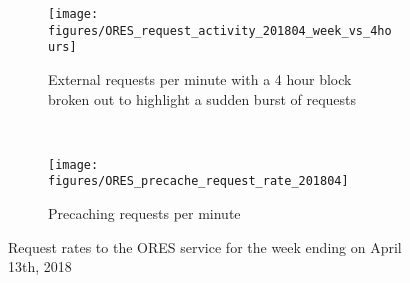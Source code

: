 \begin{figure}[h]
\centering
\begin{subfigure}[t]{\columnwidth}
  \centering
  \texttt{[image: figures/ORES\_request\_activity\_201804\_week\_vs\_4hours]}
  \caption{External requests per minute with a 4 hour block broken out to highlight a sudden burst of requests}
  \label{fig:ores_request_rate}
\end{subfigure}\\
\begin{subfigure}[t]{\columnwidth}
  \centering
  \texttt{[image: figures/ORES\_precache\_request\_rate\_201804]}
  \caption{Precaching requests per minute}
  \label{fig:ores_precache_rate}
\end{subfigure}
\caption{Request rates to the ORES service for the week ending on April 13th, 2018}
\label{fig:ores_activity}
\end{figure}
